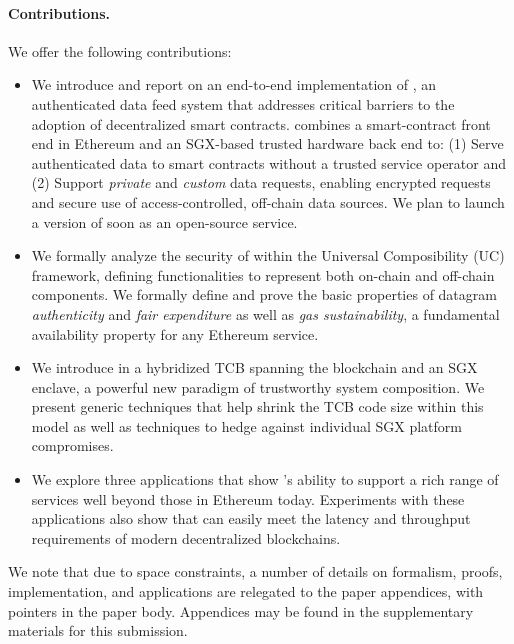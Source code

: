 \paragraph{\bf Contributions.}
We offer the following contributions:
\begin{itemize}[leftmargin=5mm]
\item
  \setlength{\itemsep}{2pt}
  \setlength{\parskip}{0pt}
  \setlength{\parsep}{0pt}
We introduce and report on an end-to-end implementation of \tcs, an authenticated data feed system that addresses critical barriers to the adoption of decentralized smart contracts. \tc combines a smart-contract front end in Ethereum and an SGX-based trusted hardware back end to: (1) Serve authenticated data to smart contracts without a trusted service operator and (2) Support {\em private} and {\em custom} data requests, enabling encrypted requests and secure use of access-controlled, off-chain data sources. We plan to launch a version of \tc soon as an open-source service.
\item We formally analyze the security of \tc within the Universal Composibility (UC) framework, defining functionalities to represent both on-chain and off-chain components. We formally define and prove the basic properties of datagram {\em authenticity} and {\em fair expenditure} as well as {\em gas sustainability}, a fundamental availability property for any Ethereum service. 
\item We introduce in \tc a hybridized TCB spanning the blockchain and an SGX enclave, a powerful new paradigm of trustworthy system composition. We present generic techniques that help shrink the TCB code size within this model as well as techniques to hedge against individual SGX platform compromises. 
\item We explore three \tc applications that show \tc's ability to support a rich range of services well beyond those in Ethereum today. Experiments with these applications also show that \tc can easily meet the latency and throughput requirements of modern decentralized blockchains. 

\end{itemize}

We note that due to space constraints, a number of details on formalism, proofs, implementation, and applications are relegated to the paper appendices, with pointers in the paper body. Appendices may be found in the supplementary materials for this submission. 

